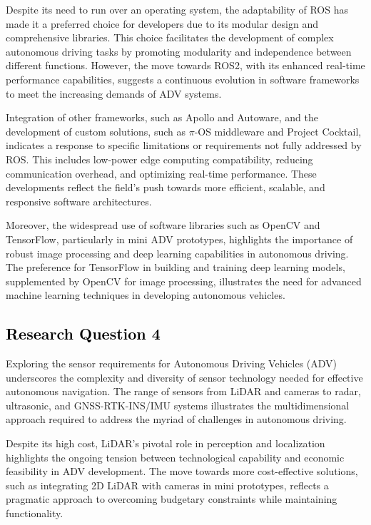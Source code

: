 \documentclass[lettersize,journal]{IEEEtran}
\begin{document}
Despite its need to run over an operating system, the adaptability of ROS has made it a preferred choice for developers due to its modular design and comprehensive libraries. This choice facilitates the development of complex autonomous driving tasks by promoting modularity and independence between different functions. However, the move towards ROS2, with its enhanced real-time performance capabilities, suggests a continuous evolution in software frameworks to meet the increasing demands of ADV systems.

Integration of other frameworks, such as Apollo and Autoware, and the development of custom solutions, such as $\pi$-OS middleware and Project Cocktail, indicates a response to specific limitations or requirements not fully addressed by ROS. This includes low-power edge computing compatibility, reducing communication overhead, and optimizing real-time performance. These developments reflect the field’s push towards more efficient, scalable, and responsive software architectures.

Moreover, the widespread use of software libraries such as OpenCV and TensorFlow, particularly in mini ADV prototypes, highlights the importance of robust image processing and deep learning capabilities in autonomous driving. The preference for TensorFlow in building and training deep learning models, supplemented by OpenCV for image processing, illustrates the need for advanced machine learning techniques in developing autonomous vehicles.

\subsection{\textcolor{black}{\textbf{Research Question 4}}}
Exploring the sensor requirements for Autonomous Driving Vehicles (ADV) underscores the complexity and diversity of sensor technology needed for effective autonomous navigation. The range of sensors from LiDAR and cameras to radar, ultrasonic, and GNSS-RTK-INS/IMU systems illustrates the multidimensional approach required to address the myriad of challenges in autonomous driving.

Despite its high cost, LiDAR’s pivotal role in perception and localization highlights the ongoing tension between technological capability and economic feasibility in ADV development. The move towards more cost-effective solutions, such as integrating 2D LiDAR with cameras in mini prototypes, reflects a pragmatic approach to overcoming budgetary constraints while maintaining functionality.
\end{document}

